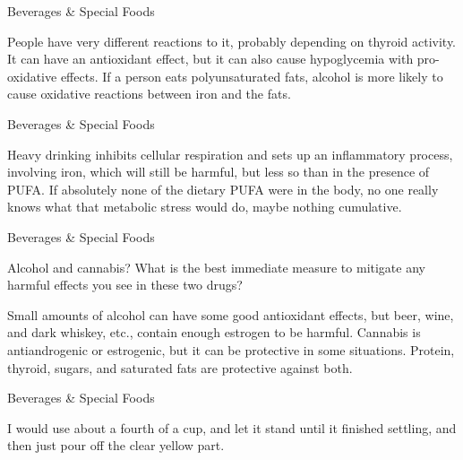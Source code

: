 \documentclass[11pt,oneside,openany,extrafontsizes]{memoir}
\begin{document}
\begin{standalonequote}{Beverages \& Special Foods}

    \begin{answer}
        People have very different reactions to it, probably depending on thyroid activity. It can have an antioxidant effect, but it can also cause hypoglycemia with pro-oxidative effects. If a person eats polyunsaturated fats, alcohol is more likely to cause oxidative reactions between iron and the fats.
    \end{answer}
\end{standalonequote}

\begin{standalonequote}{Beverages \& Special Foods}

    \begin{answer}
        Heavy drinking inhibits cellular respiration and sets up an inflammatory process, involving iron, which will still be harmful, but less so than in the presence of PUFA. If absolutely none of the dietary PUFA were in the body, no one really knows what that metabolic stress would do, maybe nothing cumulative.
    \end{answer}
\end{standalonequote}

\begin{qaexchange}{Beverages \& Special Foods}

    \begin{question}
        Alcohol and cannabis? What is the best immediate measure to mitigate any harmful effects you see in these two drugs?
    \end{question}

    \begin{answer}
        Small amounts of alcohol can have some good antioxidant effects, but beer, wine, and dark whiskey, etc., contain enough estrogen to be harmful. Cannabis is antiandrogenic or estrogenic, but it can be protective in some situations. Protein, thyroid, sugars, and saturated fats are protective against both.
    \end{answer}
\end{qaexchange}

\begin{standalonequote}{Beverages \& Special Foods}

    \begin{answer}
        I would use about a fourth of a cup, and let it stand until it finished settling, and then just pour off the clear yellow part.
    \end{answer}
\end{standalonequote}
\end{document}
